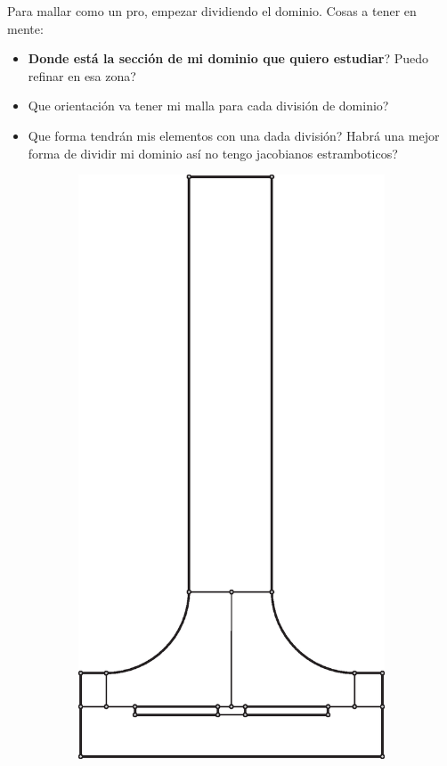 Para mallar como un pro, empezar dividiendo el dominio. Cosas a tener en mente:
\begin{itemize}
	\item \textbf{Donde está la sección de mi dominio que quiero estudiar}? Puedo refinar en esa zona?
	\item Que orientación va tener mi malla para cada división de dominio?
	\item Que forma tendrán mis elementos con una dada división? Habrá una mejor forma de dividir mi dominio así no tengo jacobianos estramboticos?
\end{itemize}


\begin{figure}[htb!]
	\centering
	\begin{subfigure}{0.49\textwidth}
		\centering
		\includegraphics[width=.7\linewidth]{fig/divisionPelton1.eps}

\end{subfigure}
\end{figure}

